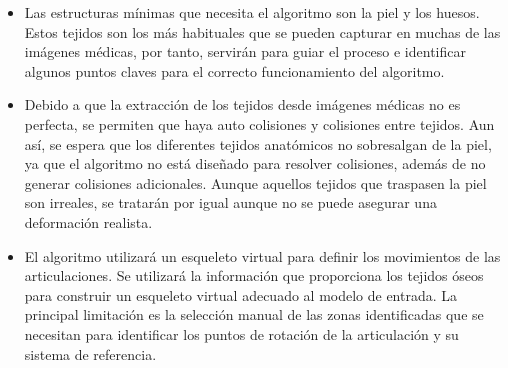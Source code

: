 \begin{itemize}
    \item Las estructuras mínimas que necesita el algoritmo son la piel y los huesos. Estos tejidos son los más habituales que se pueden capturar en muchas de las imágenes médicas, por tanto, servirán para guiar el proceso e identificar algunos puntos claves para el correcto funcionamiento del algoritmo.
    
    \item Debido a que la extracción de los tejidos desde imágenes médicas no es perfecta, se permiten que haya auto colisiones y colisiones entre tejidos. Aun así, se espera que los diferentes tejidos anatómicos no sobresalgan de la piel, ya que el algoritmo no está diseñado para resolver colisiones, además de no generar colisiones adicionales. Aunque aquellos tejidos que traspasen la piel son irreales, se tratarán por igual aunque no se puede asegurar una deformación realista.
    
    \item El algoritmo utilizará un esqueleto virtual para definir los movimientos de las articulaciones. Se utilizará la información que proporciona los tejidos óseos para construir un esqueleto virtual adecuado al modelo de entrada. La principal limitación es la selección manual de las zonas identificadas que se necesitan para identificar los puntos de rotación de la articulación y su sistema de referencia.
\end{itemize}